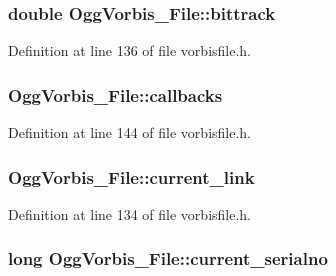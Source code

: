 \subsubsection[{\texorpdfstring{bittrack}{bittrack}}]{\setlength{\rightskip}{0pt plus 5cm}double Ogg\+Vorbis\+\_\+\+File\+::bittrack}\hypertarget{struct_ogg_vorbis___file_aa72a11d9f154636d4dc9edac4c9eb843}{}\label{struct_ogg_vorbis___file_aa72a11d9f154636d4dc9edac4c9eb843}


Definition at line 136 of file vorbisfile.\+h.

\subsubsection[{\texorpdfstring{callbacks}{callbacks}}]{ Ogg\+Vorbis\+\_\+\+File\+::callbacks}\hypertarget{struct_ogg_vorbis___file_afb1474e24193f577dd21395a76199415}{}\label{struct_ogg_vorbis___file_afb1474e24193f577dd21395a76199415}


Definition at line 144 of file vorbisfile.\+h.

\subsubsection[{\texorpdfstring{current\+\_\+link}{current_link}}]{ Ogg\+Vorbis\+\_\+\+File\+::current\+\_\+link}\hypertarget{struct_ogg_vorbis___file_a9b2d64c3739364ac4c08070aac2e0588}{}\label{struct_ogg_vorbis___file_a9b2d64c3739364ac4c08070aac2e0588}


Definition at line 134 of file vorbisfile.\+h.

\subsubsection[{\texorpdfstring{current\+\_\+serialno}{current_serialno}}]{\setlength{\rightskip}{0pt plus 5cm}long Ogg\+Vorbis\+\_\+\+File\+::current\+\_\+serialno}\hypertarget{struct_ogg_vorbis___file_ad7545f86b92a6d66641f3d04a2497763}{}\label{struct_ogg_vorbis___file_ad7545f86b92a6d66641f3d04a2497763}


